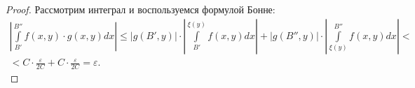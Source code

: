 \begin{proof}
	Рассмотрим интеграл и воспользуемся формулой Бонне:
	\begin{multline*}
		\left|\int\limits_{B'}^{B''}f(x,y)\cdot g(x,y)dx\right| \leqslant\left|g(B',y)\right|\cdot\left|\int\limits_{B'}^{\xi(y)}f(x,y)dx\right|+\left|g(B'',y)\right|\cdot\left|\int\limits_{\xi(y)}^{B''}f(x,y)dx\right|<\\<C\cdot\frac{\varepsilon}{2C}+C\cdot\frac{\varepsilon}{2C}=\varepsilon.
	\end{multline*} 
\end{proof}

















